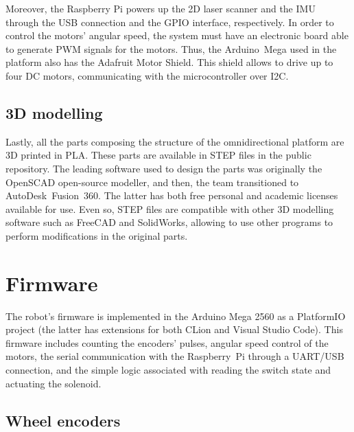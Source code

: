 \documentclass[conference]{IEEEtran}
\begin{document}
Moreover, the Raspberry Pi powers up the 2D laser scanner and the IMU through the USB connection and the GPIO interface, respectively.
In order to control the motors' angular speed, the system must have an electronic board able to generate PWM signals for the motors.
Thus, the Arduino~Mega used in the platform also has the Adafruit Motor Shield.
This shield allows to drive up to four DC motors, communicating with the microcontroller over I2C.



\subsection{3D modelling}

Lastly, all the parts composing the structure of the omnidirectional platform are 3D printed in PLA.
These parts are available in STEP files in the public repository.
The leading software used to design the parts was originally the OpenSCAD open-source modeller, and then, the team transitioned to AutoDesk~Fusion~360.
The latter has both free personal and academic licenses available for use.
Even so, STEP files are compatible with other 3D modelling software such as FreeCAD and SolidWorks, allowing to use other programs to perform modifications in the original parts.





\section{Firmware}\label{sec:fw}

The robot's firmware is implemented in the Arduino Mega 2560 as a PlatformIO project (the latter has extensions for both CLion and Visual Studio Code).
This firmware includes counting the encoders' pulses, angular speed control of the motors, the serial communication with the Raspberry~Pi through a UART/USB connection, and the simple logic associated with reading the switch state and actuating the solenoid.



\subsection{Wheel encoders}
\end{document}
